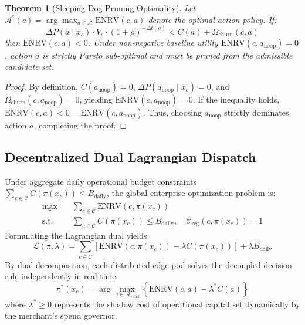 \documentclass[10pt, twocolumn, a4paper]{article}
\newtheorem{theorem}{Theorem}
\begin{document}
\begin{theorem}[Sleeping Dog Pruning Optimality]
\label{thm:sleeping_dog}
Let $\mathcal{A}^*(c) = \arg\max_{a \in \mathcal{A}} \text{ENRV}(c, a)$ denote the optimal action policy. If:
\begin{equation}
  \Delta P(a \mid x_c) \cdot V_c \cdot (1 + \rho)^{-\Delta t(a)} < C(a) + \Omega_{\text{churn}}(c, a)
\end{equation}
then $\text{ENRV}(c, a) < 0$. Under non-negative baseline utility $\text{ENRV}(c, a_{\text{noop}}) = 0$, action $a$ is strictly Pareto sub-optimal and must be pruned from the admissible candidate set.
\end{theorem}

\begin{proof}
By definition, $C(a_{\text{noop}}) = 0$, $\Delta P(a_{\text{noop}} \mid x_c) = 0$, and $\Omega_{\text{churn}}(c, a_{\text{noop}}) = 0$, yielding $\text{ENRV}(c, a_{\text{noop}}) = 0$. If the inequality holds, $\text{ENRV}(c, a) < 0 = \text{ENRV}(c, a_{\text{noop}})$. Thus, choosing $a_{\text{noop}}$ strictly dominates action $a$, completing the proof.
\end{proof}

\subsection{Decentralized Dual Lagrangian Dispatch}
Under aggregate daily operational budget constraints $\sum_{c \in \mathcal{C}} C(\pi(x_c)) \le B_{\text{daily}}$, the global enterprise optimization problem is:
\begin{align}
  \max_{\pi} \quad & \sum_{c \in \mathcal{C}} \text{ENRV}(c, \pi(x_c)) \nonumber \\
  \text{s.t.} \quad & \sum_{c \in \mathcal{C}} C(\pi(x_c)) \le B_{\text{daily}}, \quad \mathcal{C}_{\text{reg}}(c, \pi(x_c)) = 1
\end{align}
Formulating the Lagrangian dual yields:
\begin{equation}
  \mathcal{L}(\pi, \lambda) = \sum_{c \in \mathcal{C}} \left[ \text{ENRV}(c, \pi(x_c)) - \lambda C(\pi(x_c)) \right] + \lambda B_{\text{daily}}
\end{equation}
By dual decomposition, each distributed edge pod solves the decoupled decision rule independently in real-time:
\begin{equation}
  \pi^*(x_c) = \arg\max_{a \in \mathcal{A}_{\text{valid}}} \left\{ \text{ENRV}(c, a) - \lambda^* C(a) \right\}
\end{equation}
where $\lambda^* \ge 0$ represents the shadow cost of operational capital set dynamically by the merchant's spend governor.
\end{document}
